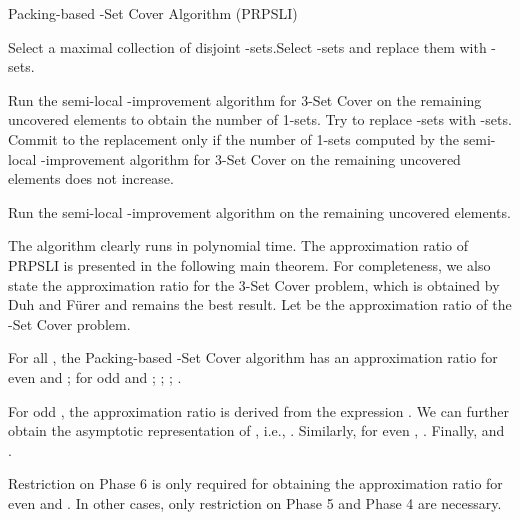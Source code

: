 \documentclass[runningheads,a4paper]{llncs}
\numberwithin{equation}{section}
\begin{document}
\begin{algorithm}
\caption{Packing-based -Set Cover Algorithm (PRPSLI)}
\begin{algorithmic}

\STATE {}
 \STATE Select a maximal collection of disjoint -sets.\REPEAT \STATE Select  -sets and replace them with  -sets.  \ENDFOR

\STATE {}
\STATE Run the semi-local -improvement algorithm for 3-Set Cover on the remaining uncovered elements to obtain the number of 1-sets.
\REPEAT \STATE Try to replace  -sets with  -sets. Commit to the replacement only if the number of 1-sets computed by the semi-local -improvement algorithm for 3-Set Cover on the remaining uncovered elements does not increase.  \ENDFOR

\STATE {}
\STATE Run the semi-local -improvement algorithm on the remaining uncovered elements.

\end{algorithmic}
\end{algorithm}


The algorithm clearly runs in polynomial time. The approximation ratio of PRPSLI is presented in the following main theorem. For completeness, we also state the approximation ratio for the 3-Set Cover problem, which is obtained by Duh and F\"{u}rer \cite{furer} and remains the best result. Let  be the approximation ratio of the -Set Cover problem.

\begin{theorem}[Main]
For all , the Packing-based -Set Cover algorithm has an approximation ratio  for even  and ;  for odd  and ; ;
; .
\end{theorem}

\begin{remark}
For odd , the approximation ratio  is derived from the expression . We can further obtain the asymptotic representation of , i.e., . Similarly, for even , .
Finally,  and .
\end{remark}

\begin{remark}
Restriction on Phase 6 is only required for obtaining the approximation ratio  for even  and . In other cases, only restriction on Phase 5 and Phase 4 are necessary.
\end{remark}
\end{document}
